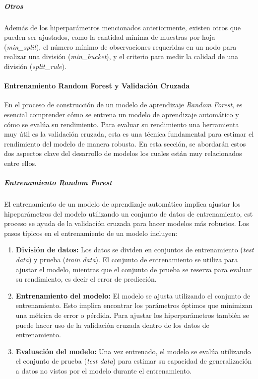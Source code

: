 \subparagraph{Otros}
Además de los hiperparámetros mencionados anteriormente, existen otros que pueden ser ajustados, como la cantidad mínima de muestras por hoja (\textit{min\_split}), el número mínimo de observaciones requeridas en un nodo para realizar una división (\textit{min\_bucket}), y el criterio para medir la calidad de una división (\textit{split\_rule}).

\paragraph{Entrenamiento Random Forest y Validación Cruzada}\label{sec:entrenamiento-rf-validacion-cruzada}

En el proceso de construcción de un modelo de aprendizaje \textit{Random Forest}, es esencial comprender cómo se entrena un modelo de aprendizaje automático y cómo se evalúa su rendimiento. Para evaluar su rendimiento una herramienta muy útil es la validación cruzada, esta es una técnica fundamental para estimar el rendimiento del modelo de manera robusta. En esta sección, se abordarán estos dos aspectos clave del desarrollo de modelos los cuales están muy relacionados entre ellos.

\subparagraph{Entrenamiento \textit{Random Forest}}

El entrenamiento de un modelo de aprendizaje automático implica ajustar los hipeparámetros del modelo utilizando un conjunto de datos de entrenamiento, est proceso se ayuda de la validación cruzada para hacer modelos más robustos. Los pasos típicos en el entrenamiento de un modelo incluyen:

\begin{enumerate}  
  \item \textbf{División de datos:} Los datos se dividen en conjuntos de entrenamiento (\textit{test data}) y prueba (\textit{train data}). El conjunto de entrenamiento se utiliza para ajustar el modelo, mientras que el conjunto de prueba se reserva para evaluar su rendimiento, es decir el error de predicción.
  
  \item \textbf{Entrenamiento del modelo:} El modelo se ajusta utilizando el conjunto de entrenamiento. Esto implica encontrar los parámetros óptimos que minimizan una métrica de error o pérdida. Para ajustar los hiperparámetros también se puede hacer uso de la validación cruzada dentro de los datos de entrenamiento.
  
  \item \textbf{Evaluación del modelo:} Una vez entrenado, el modelo se evalúa utilizando el conjunto de prueba (\textit{test data}) para estimar su capacidad de generalización a datos no vistos por el modelo durante el entrenamiento.
\end{enumerate}

